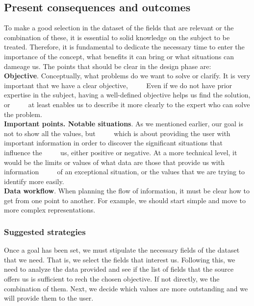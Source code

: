 \subsection{Present consequences and outcomes}
To make a good selection in the dataset of the fields that are relevant or the combination of these, it is essential to
solid knowledge on the subject to be treated. Therefore, it is fundamental to dedicate the necessary time to enter the
importance of the concept, what benefits it can bring or what situations can dameage us.
The points that should be clear in the design phase are: \\

\textbf{Objective}. Conceptually, what problems do we want to solve or clarify. It is very important that we have a clear objective,
     Even if we do not have prior expertise in the subject, having a well-defined objective helps us find the solution, or
     at least enables us to describe it more clearly to the expert who can solve the problem. \\

\textbf{Important points. Notable situations}. As we mentioned earlier, our goal is not to show all the values, but
     which is about providing the user with important information in order to discover the significant situations that influence the
     us, either positive or negative. At a more technical level, it would be the limits or values of what data are those that provide us with information
     of an exceptional situation, or the values that we are trying to identify more easily. \\

\textbf{Data workflow}. When planning the flow of information, it must be clear how to get from one point to another. For example, 
we should start simple and move to more complex representations.

\subsubsection*{Suggested strategies} 
Once a goal has been set, we must stipulate the necessary fields of the dataset that we need. That is, we select the fields that interest us. 
Following this, we need to analyze the data provided and see if the list of fields that the source offers us is sufficient to rech the chosen objective.
If not directly, we the combination of them. Next, we decide which values are more outstanding and we will provide them to the user.

